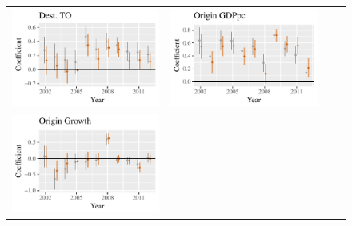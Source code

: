 \documentclass{article}
\begin{document}
\begin{figure}
\begin{tabular}{*{4}{@{}c}@{}}
\includegraphics[scale=.6]{draft_figures/rl_plots/DestTO.pdf}   & 
\includegraphics[scale=.6]{draft_figures/rl_plots/OriginGDPpc.pdf}   \\ 
\includegraphics[scale=.6]{draft_figures/rl_plots/OriginGrowth.pdf} &

\end{tabular}
\end{figure}
\end{document}
